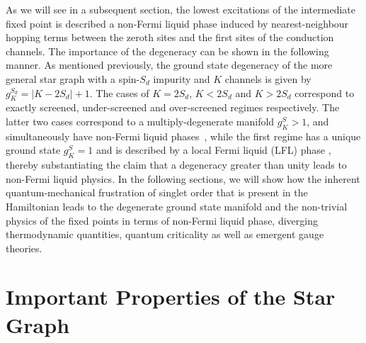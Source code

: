 \documentclass[reprint,prb,superscriptaddress]{revtex4-1}
\begin{document}
As we will see in a subsequent section, the lowest excitations of the intermediate fixed point is described a non-Fermi liquid phase induced by nearest-neighbour hopping terms between the zeroth sites and the first sites of the conduction channels. The importance of the degeneracy can be shown in the following manner. As mentioned previously, the ground state degeneracy of the more general star graph with a spin-\({S_d}\) impurity and \(K\) channels is given by \(g^{S_d}_K = |K - 2{S_d}|+1\). The cases of \(K=2{S_d}\), \(K<2{S_d}\) and \(K>2{S_d}\) correspond to exactly screened, under-screened and over-screened regimes respectively. {The latter two cases correspond to a multiply-degenerate manifold \(g^S_K > 1\), and simultaneously have non-Fermi liquid phases~\cite{Noz_blandin_1980,Gan_Andrei_Coleman_1993,emery_kivelson,Gan_mchannel_1994,Tsvelick_Weigmann_mchannel_1984,Tsvelick_weigmann_mchannel_1985,parcollet_olivier_large_N,kimura_taro_Su_N_kondo,PhysRevB.73.224445,cox_jarrell_two_channel_rev,affleck_1991_overscreen,Coleman_tsvelik,affleck1993exact,coleman_pepin_2003,roch_nicolas_costi_2009,schiller_avraham_2008,Durganandini_2011}, while the first regime has a unique ground state \(g^S_K = 1\) and is described by a local Fermi liquid (LFL) phase \cite{wilson1975,nozieres1974fermi,Noz_blandin_1980,andreiKondoreview,tsvelickKondoreview}, thereby substantiating the claim that a degeneracy greater than unity leads to non-Fermi liquid physics.} In the following sections, we will show how the inherent quantum-mechanical frustration of singlet order that is present in the Hamiltonian leads to the degenerate ground state manifold and the non-trivial physics of the fixed points in terms of non-Fermi liquid phase, diverging thermodynamic quantities, quantum criticality as well as emergent gauge theories.
\section{Important Properties of the Star Graph}
\end{document}
